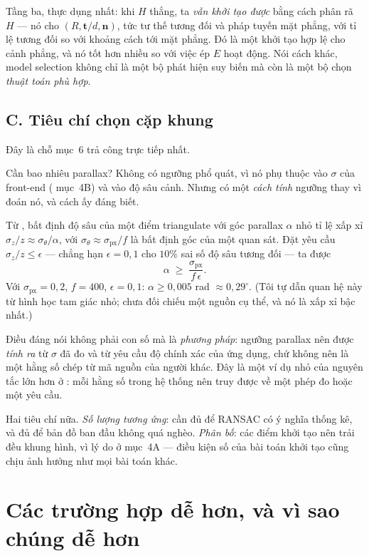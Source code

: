 \documentclass[../../vslam.tex]{subfiles}
\begin{document}
Tầng ba, thực dụng nhất: khi \(H\) thắng, ta \emph{vẫn khởi tạo được} bằng cách phân rã \(H\) --- nó cho \((R, \mathbf{t}/d, \mathbf{n})\), tức tư thế tương đối và pháp tuyến mặt phẳng, với tỉ lệ tương đối so với khoảng cách tới mặt phẳng. Đó là một khởi tạo hợp lệ cho cảnh phẳng, và nó tốt hơn nhiều so với việc ép \(E\) hoạt động. Nói cách khác, model selection không chỉ là một bộ phát hiện suy biến mà còn là một bộ chọn \emph{thuật toán phù hợp}.

\subsection{C. Tiêu chí chọn cặp khung}

Đây là chỗ  mục~6 trả công trực tiếp nhất.

Cần bao nhiêu parallax? Không có ngưỡng phổ quát, vì nó phụ thuộc vào \(\sigma\) của front-end ( mục~4B) và vào độ sâu cảnh. Nhưng có một \emph{cách tính} ngưỡng thay vì đoán nó, và cách ấy đáng biết.

Từ , bất định độ sâu của một điểm triangulate với góc parallax \(\alpha\) nhỏ tỉ lệ xấp xỉ \(\sigma_z/z \approx \sigma_\theta/\alpha\), với \(\sigma_\theta \approx \sigma_{\text{px}}/f\) là bất định góc của một quan sát. Đặt yêu cầu \(\sigma_z/z \le \epsilon\) --- chẳng hạn \(\epsilon = 0{,}1\) cho \(10\%\) sai số độ sâu tương đối --- ta được
\[
\alpha \;\ge\; \frac{\sigma_{\text{px}}}{f\,\epsilon}.
\]
Với \(\sigma_{\text{px}} = 0{,}2\), \(f = 400\), \(\epsilon = 0{,}1\): \(\alpha \ge 0{,}005\) rad \(\approx 0{,}29^\circ\). (Tôi tự dẫn quan hệ này từ hình học tam giác nhỏ; chưa đối chiếu một nguồn cụ thể, và nó là xấp xỉ bậc nhất.)

Điều đáng nói không phải con số mà là \emph{phương pháp}: ngưỡng parallax nên được \emph{tính ra} từ \(\sigma\) đã đo và từ yêu cầu độ chính xác của ứng dụng, chứ không nên là một hằng số chép từ mã nguồn của người khác. Đây là một ví dụ nhỏ của nguyên tắc lớn hơn ở : mỗi hằng số trong hệ thống nên truy được về một phép đo hoặc một yêu cầu.

Hai tiêu chí nữa. \emph{Số lượng tương ứng}: cần đủ để RANSAC có ý nghĩa thống kê, và đủ để bản đồ ban đầu không quá nghèo. \emph{Phân bố}: các điểm khởi tạo nên trải đều khung hình, vì lý do ở  mục~4A --- điều kiện số của bài toán khởi tạo cũng chịu ảnh hưởng như mọi bài toán khác.

\section{Các trường hợp dễ hơn, và vì sao chúng dễ hơn}
\end{document}
